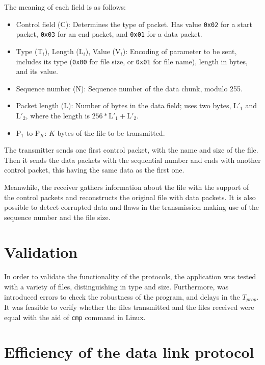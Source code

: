 \documentclass[a4paper, 11pt]{report}
\begin{document}
The meaning of each field is as follows:
\begin{itemize}
	\itemsep0em
	\item Control field (C): Determines the type of packet. Has value \texttt{0x02} for a start packet, \texttt{0x03} for an end packet, and \texttt{0x01} for a data packet.
	\item Type ($\text{T}_i$), Length ($\text{L}_i$), Value ($\text{V}_i$): Encoding of parameter to be sent, includes its type (\texttt{0x00} for file size, or \texttt{0x01} for file name), length in bytes, and its value.
	\item Sequence number (N): Sequence number of the data chunk, modulo 255.
	\item Packet length ($\text{L}$): Number of bytes in the data field; uses two bytes, $\text{L}'_1$ and $\text{L}'_2$, where the length is $256*\text{L}'_1 + \text{L}'_2$.
	\item $\text{P}_1$ to $\text{P}_K$: $K$ bytes of the file to be transmitted.
\end{itemize}

The transmitter sends one first control packet, with the name and size of the file.
Then it sends the data packets with the sequential number and ends with another control packet,
this having the same data as the first one.

Meanwhile, the receiver gathers information about the file with the support of the control packets and reconstructs the original file with data packets. 
It is also possible to detect corrupted data and flaws in the transmission making use of the sequence number and the file size.

\section{Validation} \label{sec:Validation}

In order to validate the functionality of the protocols, the application was tested with a variety of files, distinguishing in type and size. 
Furthermore, was introduced errors to check the robustness of the program, and delays in the $T_{prop}$.
It was feasible to verify whether the files transmitted and the files received were equal with the aid of \texttt{cmp} command in Linux. 

\section{Efficiency of the data link protocol} \label{sec:Efficiency}
\end{document}
